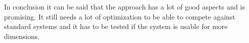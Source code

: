 \documentclass[oneside]{msvreport}%
\begin{document}
\noindent In conclusion it can be said that the approach has a lot of good aspects and is promising. It still needs a lot of optimization to be able to compete against standard systems and it has to be tested if the system is usable for more dimensions.




%
\appendix

\cleardoublepage
% 



\end{document}

